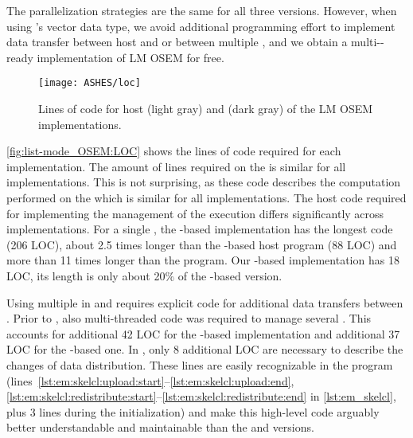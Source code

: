 The parallelization strategies are the same for all three versions.
However, when using \SkelCL's vector data type, we avoid additional programming effort to implement data transfer between host and \GPU or between multiple \GPUs, and we obtain a multi-\GPU-ready implementation of LM OSEM for free.

\begin{figure}
  \centering
  \texttt{[image: ASHES/loc]}
  \caption{Lines of code for host (light gray) and \GPU (dark gray) of the LM OSEM implementations.}
  \label{fig:list-mode_OSEM:LOC}
\end{figure}

\autoref{fig:list-mode_OSEM:LOC} shows the lines of code required for each implementation.
The amount of lines required on the \GPU is similar for all implementations.
This is not surprising, as these code describes the computation performed on the \GPU which is similar for all implementations.
The host code required for implementing the management of the \GPU execution differs significantly across implementations.
For a single \GPU, the \OpenCL-based implementation has the longest code (206 LOC), \ie about 2.5 times longer than the \CUDA-based host program (88 LOC) and more than 11 times longer than the \SkelCL program.
Our \SkelCL-based implementation has 18 LOC, \ie its length is only about 20\% of the \CUDA-based version.

Using multiple \GPUs in \OpenCL and \CUDA requires explicit code for additional data transfers between \GPUs.
Prior to , also multi-threaded code was required to manage several \GPUs.
This accounts for additional 42 LOC for the \CUDA-based implementation and additional 37 LOC for the \OpenCL-based one.
In \SkelCL, only 8 additional LOC are necessary to describe the changes of data distribution.
These lines are easily recognizable in the \SkelCL program (lines~\ref{lst:em:skelcl:upload:start}--\ref{lst:em:skelcl:upload:end}, \ref{lst:em:skelcl:redistribute:start}--\ref{lst:em:skelcl:redistribute:end} in \autoref{lst:em_skelcl}, plus 3 lines during the initialization) and make this high-level code arguably better understandable and maintainable than the \CUDA and \OpenCL versions.













